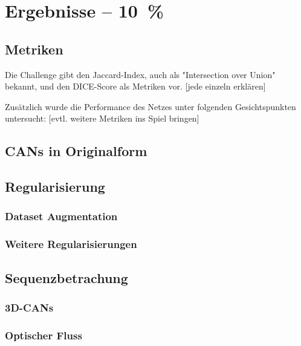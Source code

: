 \chapter{Ergebnisse -- 10~\%}

\section{Metriken}

Die Challenge gibt den Jaccard-Index, auch als "Intersection over Union" bekannt, und den DICE-Score als Metriken vor.
[jede einzeln erklären]

Zusätzlich wurde die Performance des Netzes unter folgenden Gesichtspunkten untersucht:
[evtl. weitere Metriken ins Spiel bringen]

\section{CANs in Originalform}

\section{Regularisierung}

\subsection{Dataset Augmentation}

\subsection{Weitere Regularisierungen}

\section{Sequenzbetrachung}

\subsection{3D-CANs}

\subsection{Optischer Fluss}
